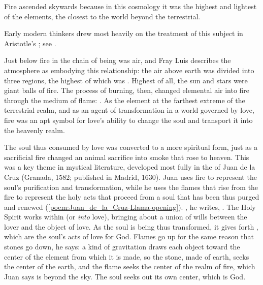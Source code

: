 Fire ascended skywards because in this cosmology it was the highest and
lightest of the elements, the closest to the world beyond the terrestrial.%
\begin{Footnote}
    Early modern thinkers drew most heavily on the treatment of this subject in
    Aristotle's ; see \autocite{Lang:AristotleMedieval}.
\end{Footnote}
Just below fire in the chain of being was air, and Fray Luis describes the
atmosphere as embodying this relationship: the air above earth was divided into
three regions, the highest of which was .%
    \Autocite[207]{LuisdeGranada:Simbolo}
Highest of all, the sun and stars were giant balls of fire.%
    \Autocite[\XXX]{LuisdeGranada:Simbolo}
The process of burning, then, changed elemental air into fire through the
medium of flame: .%
    \Autocite[205]{LuisdeGranada:Simbolo}
As the element at the farthest extreme of the terrestrial realm, and as an
agent of transformation in a world governed by love, fire was an apt symbol for
love's ability to change the soul and transport it into the heavenly realm.

The soul thus consumed by love was converted to a more spiritual form, just as
a sacrificial fire changed an animal sacrifice into smoke that rose to heaven.
This was a key theme in mystical literature, developed most fully in the
 of Juan de la Cruz (Granada, 1582; published in
Madrid, 1630).
Juan uses fire to represent the soul's purification and transformation, while
he uses the flames that rise from the fire to represent the holy acts that
proceed from a soul that has been thus purged and renewed
(\cref{poem:Juan_de_la_Cruz-Llama-opening}).
, he writes, .%
    \Autocite[790]{JuandelaCruz:Llama} 
The Holy Spirit works within  (or
\emph{into} love), bringing about a union of wills between the lover and the
object of love.
As the soul is being thus transformed, it gives forth , which
are the soul's acts of love for God.
Flames go up for the same reason that stones go down, he says: a kind of
gravitation draws each object toward the center of the element from which it is
made, so the stone, made of earth, seeks the center of the earth, and the flame
seeks the center of the realm of fire, which Juan says is beyond the sky.%
    \Autocite[792--795]{JuandelaCruz:Llama}
The soul seeks out its own center, which is God.

